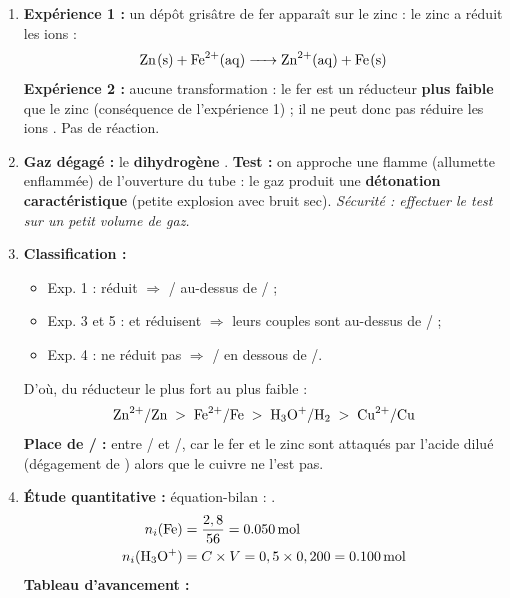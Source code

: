 \documentclass[11pt]{article}
\begin{document}
\begin{corrige}
\begin{enumerate}
    \item \textbf{Expérience 1 :} un dépôt grisâtre de fer apparaît sur le zinc : le zinc a réduit les ions  :
    \[ \ce{Zn(s) + Fe^2+(aq) -> Zn^2+(aq) + Fe(s)} \]
    \textbf{Expérience 2 :} aucune transformation : le fer est un réducteur \textbf{plus faible} que le zinc (conséquence de l'expérience 1) ; il ne peut donc pas réduire les ions . Pas de réaction.
    \item \textbf{Gaz dégagé :} le \textbf{dihydrogène }. \textbf{Test :} on approche une flamme (allumette enflammée) de l'ouverture du tube : le gaz produit une \textbf{détonation caractéristique} (petite explosion avec bruit sec). \emph{Sécurité : effectuer le test sur un petit volume de gaz.}
    \item \textbf{Classification :}
    \begin{itemize}
        \item Exp. 1 :  réduit  $\Rightarrow$ / au-dessus de / ;
        \item Exp. 3 et 5 :  et  réduisent  $\Rightarrow$ leurs couples sont au-dessus de / ;
        \item Exp. 4 :  ne réduit pas  $\Rightarrow$ / en dessous de /.
    \end{itemize}
    D'où, du réducteur le plus fort au plus faible :
    \[ \ce{Zn^2+}/\ce{Zn} \;>\; \ce{Fe^2+}/\ce{Fe} \;>\; \ce{H3O+}/\ce{H2} \;>\; \ce{Cu^2+}/\ce{Cu} \]
    \textbf{Place de / :} entre / et /, car le fer et le zinc sont attaqués par l'acide dilué (dégagement de ) alors que le cuivre ne l'est pas.
    \item \textbf{Étude quantitative :} équation-bilan : .
    \begin{align*}
        n_i(\ce{Fe}) &= \frac{2,8}{56} = \SI{0,050}{mol} \\
        n_i(\ce{H3O+}) &= C \times V = 0,5 \times 0,200 = \SI{0,100}{mol}
    \end{align*}
    \textbf{Tableau d'avancement :}
    \begin{center}
\begin{tabular}{|l|c|c|c|c|}
\hline

\end{tabular}
\end{center}
\end{enumerate}
\end{corrige}
\end{document}
